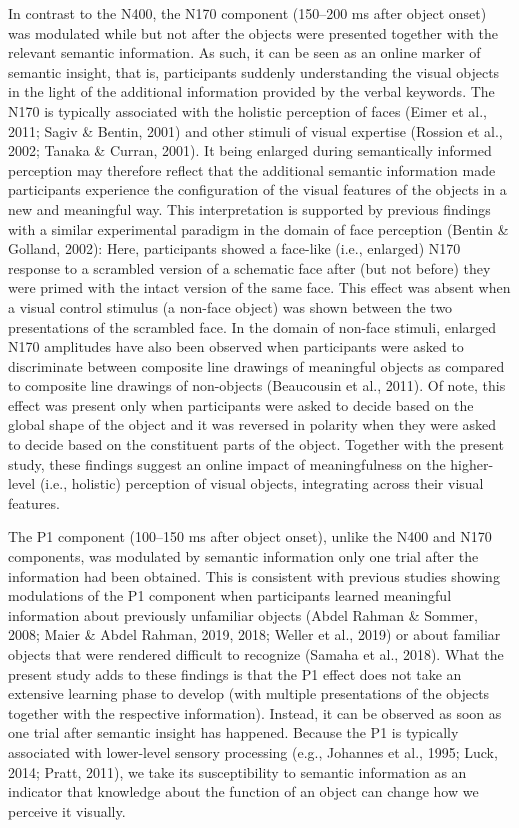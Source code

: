 \documentclass[
  english,
  man,floatsintext]{apa7}
\begin{document}
In contrast to the N400, the N170 component (150--200 ms after object onset) was modulated while but not after the objects were presented together with the relevant semantic information. As such, it can be seen as an online marker of semantic insight, that is, participants suddenly understanding the visual objects in the light of the additional information provided by the verbal keywords. The N170 is typically associated with the holistic perception of faces (Eimer et al., 2011; Sagiv \& Bentin, 2001) and other stimuli of visual expertise (Rossion et al., 2002; Tanaka \& Curran, 2001). It being enlarged during semantically informed perception may therefore reflect that the additional semantic information made participants experience the configuration of the visual features of the objects in a new and meaningful way. This interpretation is supported by previous findings with a similar experimental paradigm in the domain of face perception (Bentin \& Golland, 2002): Here, participants showed a face-like (i.e., enlarged) N170 response to a scrambled version of a schematic face after (but not before) they were primed with the intact version of the same face. This effect was absent when a visual control stimulus (a non-face object) was shown between the two presentations of the scrambled face. In the domain of non-face stimuli, enlarged N170 amplitudes have also been observed when participants were asked to discriminate between composite line drawings of meaningful objects as compared to composite line drawings of non-objects (Beaucousin et al., 2011). Of note, this effect was present only when participants were asked to decide based on the global shape of the object and it was reversed in polarity when they were asked to decide based on the constituent parts of the object. Together with the present study, these findings suggest an online impact of meaningfulness on the higher-level (i.e., holistic) perception of visual objects, integrating across their visual features.

The P1 component (100--150 ms after object onset), unlike the N400 and N170 components, was modulated by semantic information only one trial after the information had been obtained. This is consistent with previous studies showing modulations of the P1 component when participants learned meaningful information about previously unfamiliar objects (Abdel Rahman \& Sommer, 2008; Maier \& Abdel Rahman, 2019, 2018; Weller et al., 2019) or about familiar objects that were rendered difficult to recognize (Samaha et al., 2018). What the present study adds to these findings is that the P1 effect does not take an extensive learning phase to develop (with multiple presentations of the objects together with the respective information). Instead, it can be observed as soon as one trial after semantic insight has happened. Because the P1 is typically associated with lower-level sensory processing (e.g., Johannes et al., 1995; Luck, 2014; Pratt, 2011), we take its susceptibility to semantic information as an indicator that knowledge about the function of an object can change how we perceive it visually.
\end{document}
